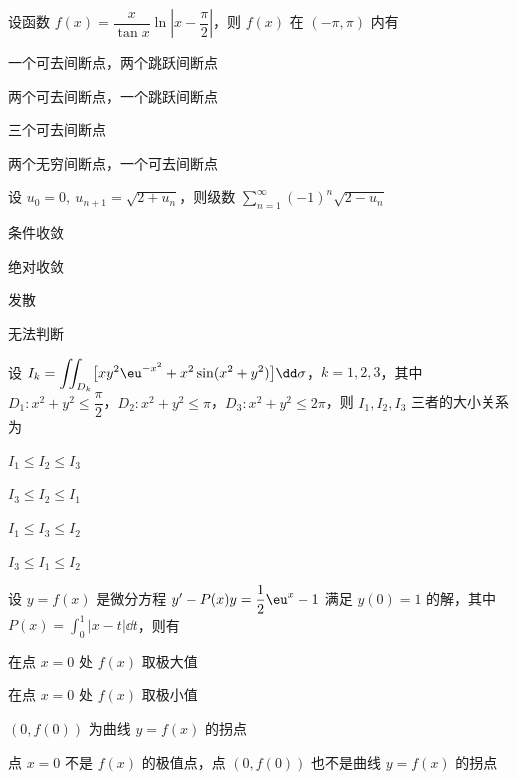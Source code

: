 
\begin{question}[index=1]
设函数 $f(x)=\dfrac{x}{\tan x}\ln\left|x-\dfrac{\pi}{2}\right|$，则 $f(x)$ 在 $(-\pi,\pi)$ 内有
\begin{choices}[columns=1]
\item 一个可去间断点，两个跳跃间断点
\item 两个可去间断点，一个跳跃间断点
\item 三个可去间断点
\item 两个无穷间断点，一个可去间断点
\end{choices}
\end{question}
\QuestionBreak

\begin{question}[index=2]
设 $u_0=0,\ u_{n+1}=\sqrt{2+u_n}$，则级数 $\displaystyle\sum_{n=1}^{\infty}(-1)^n\sqrt{2-u_n}$
\begin{choices}[columns=4]
\item 条件收敛
\item 绝对收敛
\item 发散
\item 无法判断
\end{choices}
\end{question}
\QuestionBreak

\begin{question}[index=3]
设 $\displaystyle I_k=\iint_{D_k}\bigl[xy^2\eu^{-x^2}+x^2\sin(x^2+y^2)\bigr]\dd\sigma$，$k=1,2,3$，其中
$D_1:x^2+y^2\leq\dfrac{\pi}{2}$，$D_2:x^2+y^2\leq\pi$，$D_3:x^2+y^2\leq2\pi$，则 $I_1,I_2,I_3$ 三者的大小关系为
\begin{choices}[columns=4]
\item $I_1\leq I_2\leq I_3$
\item $I_3\leq I_2\leq I_1$
\item $I_1\leq I_3\leq I_2$
\item $I_3\leq I_1\leq I_2$
\end{choices}
\end{question}
\QuestionBreak

\begin{question}[index=4]
设 $y=f(x)$ 是微分方程 $y'-P(x)y=\dfrac12\eu^x-1$ 满足 $y(0)=1$ 的解，其中 \allowbreak\mbox{$\displaystyle P(x)=\int_0^1|x-t|\dd t$，则有}
\begin{choices}[columns=1]
\item 在点 $x=0$ 处 $f(x)$ 取极大值
\item 在点 $x=0$ 处 $f(x)$ 取极小值
\item $(0,f(0))$ 为曲线 $y=f(x)$ 的拐点
\item 点 $x=0$ 不是 $f(x)$ 的极值点，点 $(0,f(0))$ 也不是曲线 $y=f(x)$ 的拐点
\end{choices}
\end{question}
\QuestionBreak

